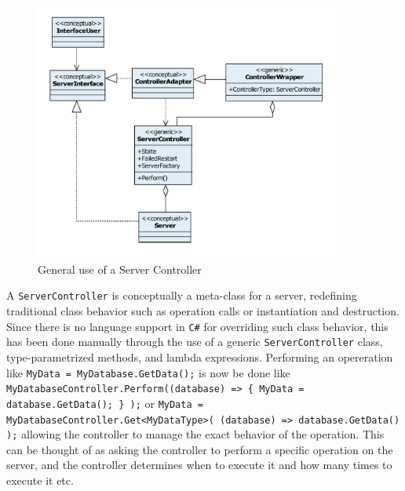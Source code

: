 \documentclass[a4paper,oneside,10pt]{report}
\newcommand{\cs}{\texttt{C\#}}
\newcommand{\textcode}[1]{\vspace{0.3em} \newline  \hspace*{2em} \texttt{\footnotesize{#1}} \newline \vspace{0.3em}}
\newcommand{\codeindent}{\hspace*{4em}}
\begin{document}
\begin{figure}
	\centering
		\includegraphics[width=0.9\textwidth]{ServerControllerClassDiagram.pdf}
	\caption{General use of a Server Controller}
	\label{fig:ServerControllerCD}
\end{figure}

A \texttt{ServerController} is conceptually a meta-class for a server, redefining traditional class behavior such as operation calls or instantiation and destruction. Since there is no language support in \cs{} for overriding such class behavior, this has been done manually through the use of a generic \texttt{ServerController} class, type-parametrized methods, and lambda expressions. Performing an opereration like \textcode{MyData = MyDatabase.GetData();} is now be done like \textcode{MyDatabaseController.Perform(\newline \codeindent (database) => \{ MyData = database.GetData(); \} );} or \textcode{MyData = MyDatabaseController.Get<MyDataType>( \newline \codeindent(database) => database.GetData() );} allowing the controller to manage the exact behavior of the operation. This can be thought of as asking the controller to perform a specific operation on the server, and the controller determines when to execute it and how many times to execute it etc.





\appendix
\end{document}
